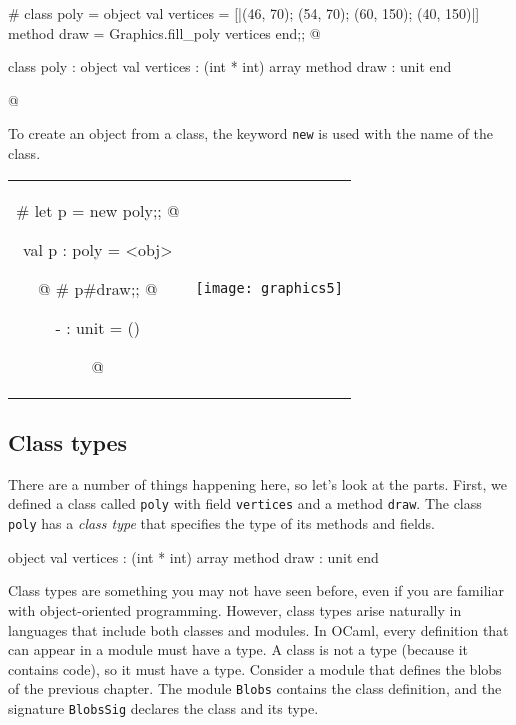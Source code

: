 \label{keyword:class}
\begin{ocaml}
# class poly =
  object
     val vertices = [|(46, 70); (54, 70); (60, 150); (40, 150)|]
     method draw = Graphics.fill_poly vertices
  end;;
@
\begin{topoutput}
class poly : object val vertices : (int * int) array method draw : unit end
\end{topoutput}
@
\end{ocaml}
%
\label{keyword:new}
To create an object from a class, the keyword \hbox{\lstinline/new/} is used with the name of the class.

\begin{center}
\begin{tabular}{cc}
\begin{minipage}[b]{3in}
\begin{ocamllistingx}
# let p = new poly;;
@
\begin{topoutput}
val p : poly = <obj>
\end{topoutput}
@
# p#draw;;
@
\begin{topoutput}
- : unit = ()
\end{topoutput}
@
\end{ocamllistingx}
\end{minipage}
&
\texttt{[image: graphics5]}
\end{tabular}
\end{center}

\subsection{Class types}

There are a number of things happening here, so let's look at the parts.  First, we defined a
class called \hbox{\lstinline/poly/} with field \hbox{\lstinline/vertices/} and a method \hbox{\lstinline/draw/}.  The
class \hbox{\lstinline/poly/} has a \emph{class type} that specifies the type of its methods and fields.

\begin{ocaml}
object
   val vertices : (int * int) array
   method draw : unit
end
\end{ocaml}
%
\label{classes:types}
Class types are something you may not have seen before, even if you are familiar with
object-oriented programming.  However, class types arise naturally in languages that include both
classes and modules.  In OCaml, every definition that can appear in a module must have a type.  A
class is not a type (because it contains code), so it must have a type.  Consider a module that
defines the blobs of the previous chapter.  The module \hbox{\lstinline/Blobs/} contains the class
definition, and the signature \hbox{\lstinline/BlobsSig/} declares the class and its type.

